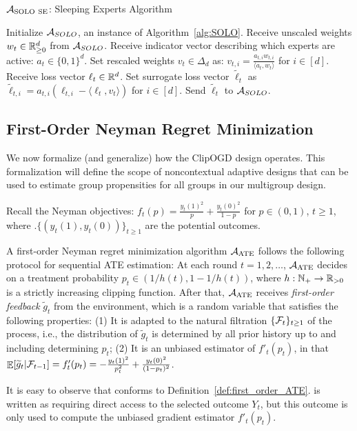 \begin{algorithm}[ht]
\caption{$\mathcal{A}_\mathrm{SOLO \ SE}$: Sleeping Experts Algorithm}
\label{alg:SE}

\begin{algorithmic}[1]
\STATE Initialize $\mathcal{A}_{SOLO}$, an instance of Algorithm~\ref{alg:SOLO}.
    \STATE Receive unscaled weights $w_t \in \mathbb{R}^d_{\geq 0}$ from $\mathcal{A}_{SOLO}$.
    \STATE Receive indicator vector describing which experts are active: $a_t \in \{0, 1\}^d$.
    \STATE Set rescaled weights $v_t \in \Delta_d$ as: $v_{t, i} = \frac{a_{t, i} w_{t, i}}{\langle a_t, w_t \rangle}$ for $i \in [d]$.
    \STATE Receive loss vector $\ell_t \in \mathbb{R}^d$.
    \STATE Set surrogate loss vector $\widetilde{\ell}_t$ as $\widetilde{\ell}_{t, i} = a_{t, i} (\ell_{t, i} - \langle \ell_t, v_t \rangle)$ for $i \in [d]$.
    \STATE Send $\widetilde{\ell}_t$ to $\mathcal{A}_{SOLO}$.
\ENDFOR
\end{algorithmic}
\end{algorithm}


\subsection{First-Order Neyman Regret Minimization} \label{app:multigroup-first_order}

We now formalize (and generalize) how the ClipOGD design operates. This formalization will define the scope of noncontextual adaptive designs that can be used to estimate group propensities for all groups in our multigroup design.

\begin{definition} \label{def:first_order_ATE}
Recall the Neyman objectives: $f_t(p) = \frac{y_t(1)^2}{p} + \frac{y_t(0)^2}{1-p}$ for $p \in (0, 1)$, $t \geq 1$, where .$\{(y_t(1), y_t(0))\}_{t \geq 1}$ are the potential outcomes. 

A first-order Neyman regret minimization algorithm $\mathcal{A}_\mathrm{ATE}$ follows the following protocol for sequential ATE estimation: At each round $t = 1, 2, \ldots$, $\mathcal{A}_\mathrm{ATE}$ decides on a treatment probability $p_t \in (1/h(t), 1-1/h(t))$, where $h: \mathbb{N}_+ \to \mathbb{R}_{> 0}$ is a strictly increasing clipping function. After that, $\mathcal{A}_\mathrm{ATE}$ receives \emph{first-order feedback} $\widetilde{g}_t$ from the environment, which is a random variable that satisfies the following properties: (1) It is adapted to the natural filtration $\{\mathcal{F}_t\}_{t \geq 1}$ of the process, i.e., the distribution of $\widetilde{g}_t$ is determined by all prior history up to and including determining $p_t$; (2) It is an unbiased estimator of $f'_t(p_t)$, in that $\mathop{\mathbb{E}}[ \widetilde{g}_t | \mathcal{F}_{t-1}] = f'_t(p_t) = - \frac{y_t(1)^2}{p_t^2} + \frac{y_t(0)^2}{(1-p_t)^2}$. 
\end{definition}
%
It is easy to observe that  conforms to Definition~\ref{def:first_order_ATE}.   is written as requiring direct access to the selected outcome $Y_t$, but this outcome is only used to compute the unbiased gradient estimator $f'_t(p_t)$.


